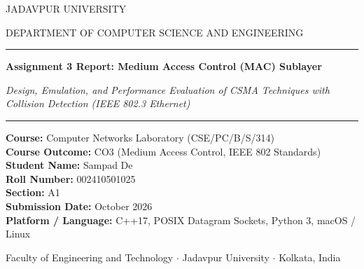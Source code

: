 \documentclass[11pt,a4paper]{article}
\begin{document}
\begin{titlepage}
    \centering
    \vspace*{0.8cm}
    
    {\small JADAVPUR UNIVERSITY \par}
    \vspace{0.4cm}
    {\small DEPARTMENT OF COMPUTER SCIENCE AND ENGINEERING\par}
    \vspace{0.8cm}
    
    \rule{\textwidth}{1.2pt}\par
    \vspace{0.4cm}
    {\huge\bfseries Assignment 3 Report: Medium Access Control (MAC) Sublayer \par}
    \vspace{0.3cm}
    {\Large\itshape Design, Emulation, and Performance Evaluation of CSMA Techniques with Collision Detection (IEEE 802.3 Ethernet) \par}
    \vspace{0.4cm}
    \rule{\textwidth}{1.2pt}\par
    
    \vspace{1.2cm}
    
    \begin{flushleft} \large
        \textbf{Course:} Computer Networks Laboratory (CSE/PC/B/S/314) \\
        \textbf{Course Outcome:} CO3 (Medium Access Control, IEEE 802 Standards) \\
        \textbf{Student Name:} Sampad De \\
        \textbf{Roll Number:} 002410501025 \\
        \textbf{Section:} A1 \\
        \textbf{Submission Date:} October 2026 \\
        \textbf{Platform / Language:} C++17, POSIX Datagram Sockets, Python 3, macOS / Linux \\
    \end{flushleft}
    
    \vfill
    
    \begin{center}
        \small Faculty of Engineering and Technology $\cdot$ Jadavpur University $\cdot$ Kolkata, India
    \end{center}
\end{titlepage}
\end{document}
